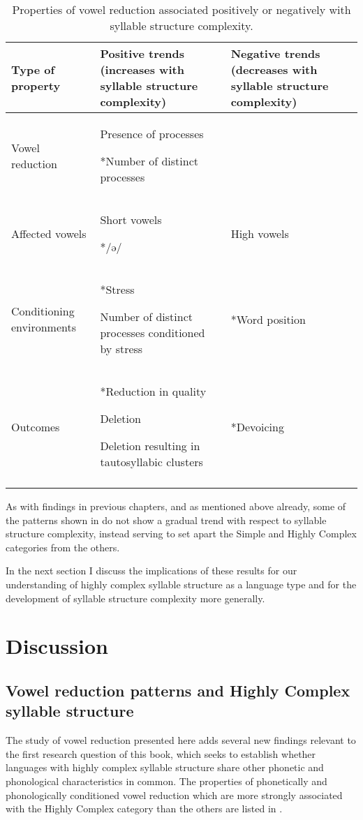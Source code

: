 \begin{table}
\begin{tabularx}{\textwidth}{QQQ}
\lsptoprule

{Type of property} & Positive trends (increases with syllable structure complexity) & Negative trends (decreases with syllable structure complexity)\\\midrule
{Vowel reduction} & Presence of processes

*Number of distinct processes & \\\tablevspace
{Affected vowels} & Short vowels

*/ə/ & High vowels\\\tablevspace
{Conditioning environments} & *Stress

Number of distinct processes conditioned by stress & *Word position\\\tablevspace
{Outcomes} & *Reduction in quality

Deletion

Deletion resulting in tautosyllabic clusters & *Devoicing\\
\lspbottomrule
\end{tabularx}
\caption{\label{tab:6.10}Properties of vowel reduction associated positively or negatively with syllable structure complexity.}
\end{table}

  As with findings in previous chapters, and as mentioned above already, some of the patterns shown in  do not show a gradual trend with respect to syllable structure complexity, instead serving to set apart the Simple and Highly Complex categories from the others.

  In the next section I discuss the implications of these results for our understanding of highly complex syllable structure as a language type and for the development of syllable structure complexity more generally.

\section{Discussion}\label{sec:6.4}
\subsection{Vowel reduction patterns and Highly Complex syllable structure}\label{sec:6.4.1}

  The study of vowel reduction presented here adds several new findings relevant to the first research question of this book, which seeks to establish whether languages with highly complex syllable structure share other phonetic and phonological characteristics in common. The properties of phonetically and phonologically conditioned vowel reduction which are more strongly associated with the Highly Complex category than the others are listed in .

